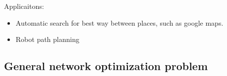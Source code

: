Applicaitons:
\begin{itemize}
        \item Automatic search for best way between places, such as google maps.
        \item Robot path planning
        
\end{itemize}

\subsection{General network optimization problem}

